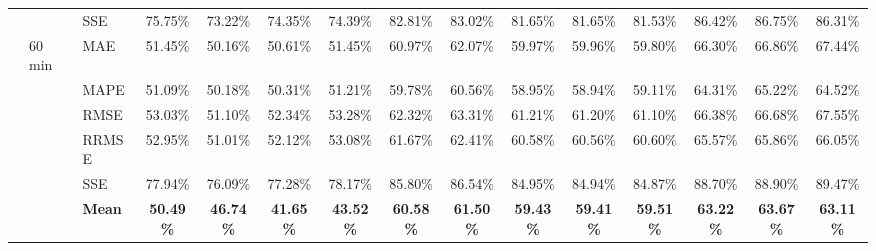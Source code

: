 {\begin{longtable}{lllcccccccccccc}
{} &  & {SSE} & {75.75\%} & {73.22\%} & {74.35\%} & {74.39\%} & {82.81\%} & {83.02\%} & {81.65\%} & {81.65\%} & {81.53\%} & {86.42\%} & {86.75\%} & {86.31\%} \\
{} & {60 min} & {MAE} & {51.45\%} & {50.16\%} & {50.61\%} & {51.45\%} & {60.97\%} & {62.07\%} & {59.97\%} & {59.96\%} & {59.80\%} & {66.30\%} & {66.86\%} & {67.44\%} \\
{} & {} & {MAPE} & {51.09\%} & {50.18\%} & {50.31\%} & {51.21\%} & {59.78\%} & {60.56\%} & {58.95\%} & {58.94\%} & {59.11\%} & {64.31\%} & {65.22\%} & {64.52\%} \\
{} & {} & {RMSE} & {53.03\%} & {51.10\%} & {52.34\%} & {53.28\%} & {62.32\%} & {63.31\%} & {61.21\%} & {61.20\%} & {61.10\%} & {66.38\%} & {66.68\%} & {67.55\%} \\
{} & {} & {RRMSE} & {52.95\%} & {51.01\%} & {52.12\%} & {53.08\%} & {61.67\%} & {62.41\%} & {60.58\%} & {60.56\%} & {60.60\%} & {65.57\%} & {65.86\%} & {66.05\%} \\
&  & {SSE} & {77.94\%} & {76.09\%} & {77.28\%} & {78.17\%} & {85.80\%} & {86.54\%} & {84.95\%} & {84.94\%} & {84.87\%} & {88.70\%} & {88.90\%} & {89.47\%} \\ \hline
 &  & {\textbf{Mean}} & {\textbf{50.49\%}} & {\textbf{46.74\%}} & {\textbf{41.65\%}} & {\textbf{43.52\%}} & {\textbf{60.58\%}} & {\textbf{61.50\%}} & {\textbf{59.43\%}} & {\textbf{59.41\%}} & {\textbf{59.51\%}} & {\textbf{63.22\%}} & {\textbf{63.67\%}} & {\textbf{63.11\%}}
\end{longtable}
}
